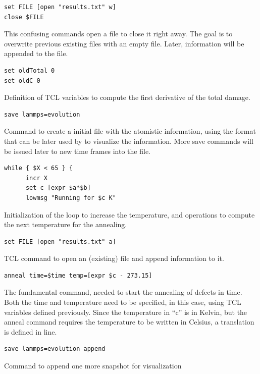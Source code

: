\begin{lstlisting}[firstnumber=21]
set FILE [open "results.txt" w]
close $FILE
\end{lstlisting}
This confusing commands open a file to close it right away. The goal is to overwrite previous existing files with an empty file. Later, information will be appended to the file.

\begin{lstlisting}[firstnumber=24]
set oldTotal 0
set oldC 0
\end{lstlisting}
Definition of TCL variables to compute the first derivative of the total damage.

\begin{lstlisting}[firstnumber=27]
save lammps=evolution
\end{lstlisting}
Command to create a initial file with the atomistic information, using the  format that can be later used by  to visualize the information. More save commands will be issued later to  new time frames into the file.

\begin{lstlisting}[firstnumber=28]
while { $X < 65 } {
      incr X
      set c [expr $a*$b]
      lowmsg "Running for $c K"      
\end{lstlisting}
Initialization of the loop to increase the temperature, and operations to compute the next temperature for the annealing.

\begin{lstlisting}[firstnumber=32]
      set FILE [open "results.txt" a]
\end{lstlisting}
TCL command to open an (existing) file and append information to it.

\begin{lstlisting}[firstnumber=33]
      anneal time=$time temp=[expr $c - 273.15]
\end{lstlisting}
The fundamental  command, needed to start the annealing of defects in time. Both the time and temperature need to be specified, in this case, using TCL variables defined previously. Since the temperature in ``c'' is in Kelvin, but the anneal command requires the temperature to be written in Celsius, a translation is defined in line.

\begin{lstlisting}[firstnumber=34]
      save lammps=evolution append
\end{lstlisting}
Command to append one more snapshot for visualization

